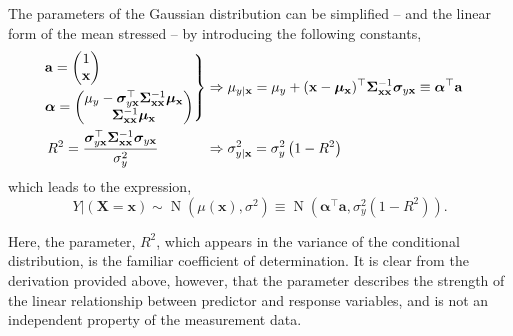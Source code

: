 \documentclass[12pt, twoside, draft]{article}
\begin{document}
The parameters of the Gaussian distribution can be simplified -- and the linear form of the mean stressed -- by introducing the following constants,
\begin{align}\label{eq:conditional_mean_variance}
\begin{rcases}
\mathbf{a} = \begin{pmatrix} 1 \\ \mathbf{x} \end{pmatrix} \\
\boldsymbol{\alpha} = \begin{pmatrix} \mu_y - \boldsymbol{\sigma}_{y\mathbf{x}}^\top \boldsymbol{\Sigma}^{-1}_{\mathbf{x} \mathbf{x}} \boldsymbol{\mu}_{\mathbf{x}} \\ \boldsymbol{\Sigma}^{-1}_{\mathbf{x} \mathbf{x}} \boldsymbol{\mu}_{\mathbf{x}} \end{pmatrix}
\end{rcases} &\Rightarrow
\mu_{y|\mathbf{x}} = \mu_y + (\mathbf{x} - \boldsymbol{\mu}_{\mathbf{x}})^\top \boldsymbol{\Sigma}_{\mathbf{x} \mathbf{x}}^{-1} \boldsymbol{\sigma}_{y\mathbf{x}} \equiv \boldsymbol{\alpha}^\top \mathbf{a} \\
R^2 = \frac{\boldsymbol{\sigma}_{y\mathbf{x}}^\top \boldsymbol{\Sigma}_{\mathbf{x} \mathbf{x}}^{-1} \boldsymbol{\sigma}_{y \mathbf{x}}}{\sigma^2_y} \hspace{34pt} &\Rightarrow \sigma_{y|\mathbf{x}}^2 = \sigma^2_y \left(1 - R^2 \right)
\end{align}
which leads to the expression,
\begin{equation}\label{eq:conditional_distribution}
Y|(\mathbf{X} = \mathbf{x}) \sim \operatorname{N}(\mu(\mathbf{x}), \sigma^2) \equiv \operatorname{N} \left(\boldsymbol{\alpha}^\top \mathbf{a},  \sigma^2_y \left(1 - R^2 \right) \right).
\end{equation}

Here, the parameter, $R^2$, which appears in the variance of the conditional distribution, is the familiar coefficient of determination.  It is clear from the derivation provided above, however, that the parameter describes the strength of the linear relationship between predictor and response variables, and is not an independent property of the measurement data.
\end{document}
